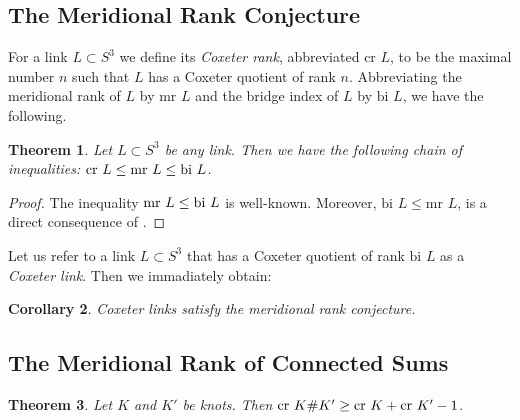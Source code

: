 \documentclass[a4paper]{article}
\newtheorem{theorem}{Theorem}[section]
\newtheorem{corollary}[theorem]{Corollary}
\theoremstyle{definition}
\begin{document}
\subsection{The Meridional Rank Conjecture}
For a link $L \subset S^3$ we define its \textit{Coxeter rank}, abbreviated $\text{cr } L$, to be the maximal number $n$ such that $L$ has a Coxeter quotient of rank $n$. Abbreviating the meridional rank of $L$ by $\text{mr }L$ and the bridge index of $L$ by $\text{bi } L$, we have the following.

\begin{theorem}
Let $L \subset S^3$ be any link. Then we have the following chain of inequalities: $\textup{cr }L \leq \textup{mr }L \leq \textup{bi } L$.
\end{theorem}

\begin{proof}
The inequality $\textup{mr } L \leq \text{bi } L$ is well-known. Moreover, $\text{bi } L \leq \text{mr } L$, is a direct consequence of \cite[Lemma 2.1]{felikson2009}.
\end{proof}

Let us refer to a link $L \subset S^3$ that has a Coxeter quotient of rank $\text{bi } L$ as a \textit{Coxeter link}. Then we immadiately obtain:

\begin{corollary}\label{cor:coxeter-links-meridional-rank}
Coxeter links satisfy the meridional rank conjecture.
\end{corollary}

\subsection{The Meridional Rank of Connected Sums}

\begin{theorem}\label{thm:connected-sums-coxeter-rank}
Let $K$ and $K'$ be knots. Then $\textup{cr } K\#K' \geq \textup{cr } K + \textup{cr } K' - 1$.
\end{theorem}
\end{document}
